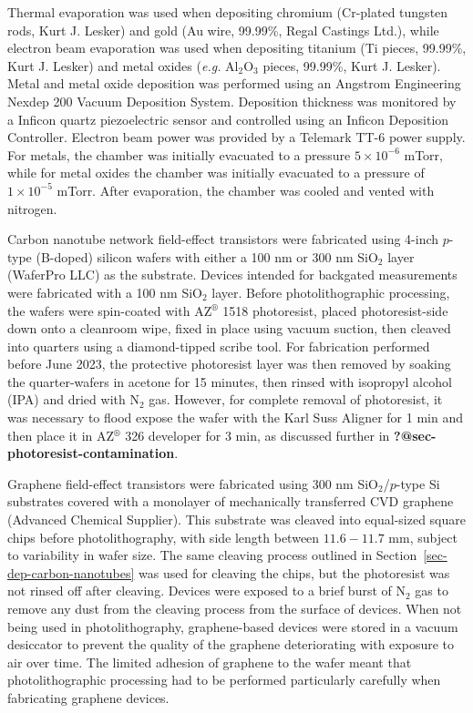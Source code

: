 \documentclass[
  a4paper,
]{scrbook}
\begin{document}
Thermal evaporation was used when depositing chromium (Cr-plated
tungsten rods, Kurt J. Lesker) and gold (Au wire, 99.99\%, Regal
Castings Ltd.), while electron beam evaporation was used when depositing
titanium (Ti pieces, 99.99\%, Kurt J. Lesker) and metal oxides
(\emph{e.g.} Al\(_2\)O\(_3\) pieces, 99.99\%, Kurt J. Lesker). Metal and
metal oxide deposition was performed using an Angstrom Engineering
Nexdep 200 Vacuum Deposition System. Deposition thickness was monitored
by a Inficon quartz piezoelectric sensor and controlled using an Inficon
Deposition Controller. Electron beam power was provided by a Telemark
TT-6 power supply. For metals, the chamber was initially evacuated to a
pressure \(5 \times 10^{-6}\) mTorr, while for metal oxides the chamber
was initially evacuated to a pressure of \(1 \times 10^{-5}\) mTorr.
After evaporation, the chamber was cooled and vented with nitrogen.

Carbon nanotube network field-effect transistors were fabricated using
4-inch \(p\)-type (B-doped) silicon wafers with either a 100 nm or 300
nm SiO\(_2\) layer (WaferPro LLC) as the substrate. Devices intended for
backgated measurements were fabricated with a 100 nm SiO\(_2\) layer.
Before photolithographic processing, the wafers were spin-coated with
AZ\(^\circledR\) 1518 photoresist, placed photoresist-side down onto a
cleanroom wipe, fixed in place using vacuum suction, then cleaved into
quarters using a diamond-tipped scribe tool. For fabrication performed
before June 2023, the protective photoresist layer was then removed by
soaking the quarter-wafers in acetone for 15 minutes, then rinsed with
isopropyl alcohol (IPA) and dried with N\(_2\) gas. However, for
complete removal of photoresist, it was necessary to flood expose the
wafer with the Karl Suss Aligner for 1 min and then place it in
AZ\(^\circledR\) 326 developer for 3 min, as discussed further in
\textbf{?@sec-photoresist-contamination}.

Graphene field-effect transistors were fabricated using 300 nm
SiO\(_2\)/\(p\)-type Si substrates covered with a monolayer of
mechanically transferred CVD graphene (Advanced Chemical Supplier). This
substrate was cleaved into equal-sized square chips before
photolithography, with side length between \(11.6-11.7\) mm, subject to
variability in wafer size. The same cleaving process outlined in
Section~\ref{sec-dep-carbon-nanotubes} was used for cleaving the chips,
but the photoresist was not rinsed off after cleaving. Devices were
exposed to a brief burst of N\(_2\) gas to remove any dust from the
cleaving process from the surface of devices. When not being used in
photolithography, graphene-based devices were stored in a vacuum
desiccator to prevent the quality of the graphene deteriorating with
exposure to air over time. The limited adhesion of graphene to the wafer
meant that photolithographic processing had to be performed particularly
carefully when fabricating graphene devices.
\end{document}
